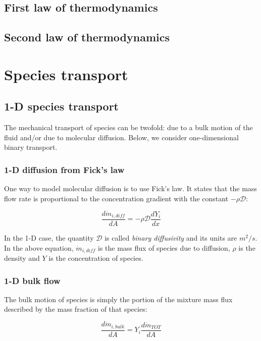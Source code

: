 \documentclass[10pt,twocolumn]{article}
\begin{document}
\subsection{First law of thermodynamics}


\subsection{Second law of thermodynamics}



\section{Species transport}

\subsection{1-D species transport}

The mechanical transport of species can be twofold: due to a bulk motion of the fluid and/or due to molecular diffusion. Below, we consider one-dimensional binary transport.

\subsubsection{1-D diffusion from Fick's law}

One way to model molecular diffusion is to use Fick's law. It states that the mass flow rate is proportional to the concentration gradient with the constant $-\rho \mathcal{D}$:

\begin{equation}
\frac{d \dot{m}_{i, diff}}{dA} = - \rho \mathcal{D} \frac{d Y_i}{dx}
\end{equation}

In the 1-D case, the quantity $\mathcal{D}$ is called \textit{binary diffusivity} and its units are $m^2/s$. In the above equation, $\dot{m}_{i, diff}$ is the mass flux of species due to diffusion, $\rho$ is the density and $Y$ is the concentration of species.

\subsubsection{1-D bulk flow}

The bulk motion of species is simply the portion of the mixture mass flux described by the mass fraction of that species:

\begin{equation}
\frac{d \dot{m}_{i, bulk}}{dA} = Y_i \frac{d \dot{m}_{TOT}}{d A}
\end{equation}
\end{document}

